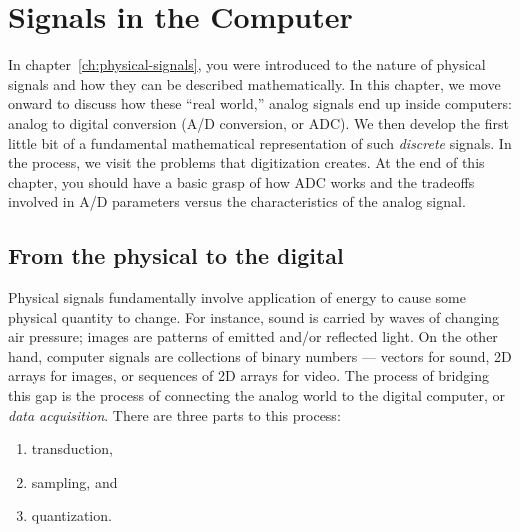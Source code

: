 
%
%
%
%
%
%
%
%
%

\chapter{Signals in the Computer}
\label{ch:computer-signals}

In chapter~\ref{ch:physical-signals}, you were introduced to the
nature of physical signals and how they can be described
mathematically.  In this chapter, we move onward to discuss how these
``real world,'' analog signals end up inside computers: analog to
digital conversion (A/D conversion, or ADC). We then develop the first
little bit of a fundamental mathematical representation of such
\emph{discrete} signals. In the process, we visit the problems that
digitization creates. At the end of this chapter, you should have a
basic grasp of how ADC works and the tradeoffs involved in A/D
parameters versus the characteristics of the analog signal.

\section{From the physical to the digital}

Physical signals fundamentally involve application of energy to cause
some physical quantity to change. For instance, sound is carried by
waves of changing air pressure; images are patterns of emitted and/or
reflected light. On the other hand, computer signals are collections
of binary numbers --- vectors for sound, 2D arrays for images, or
sequences of 2D arrays for video. The process of bridging this gap is
the process of connecting the analog world to the digital
computer, or \emph{data acquisition}. There are three parts to this
process:
\begin{enumerate}
\item transduction,
\item sampling, and
\item quantization.
\end{enumerate}

